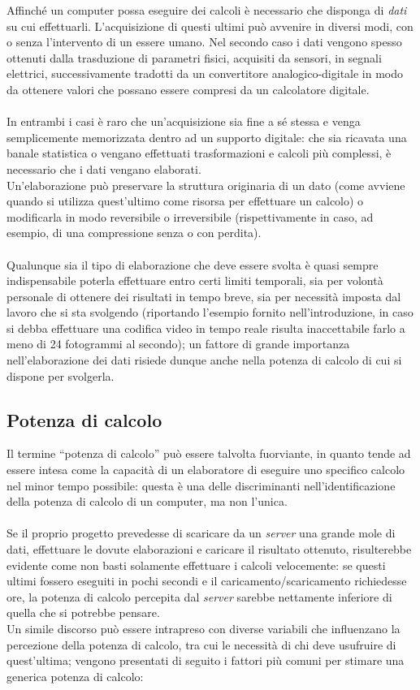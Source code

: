 Affinché un computer possa eseguire dei calcoli è necessario che disponga di
\emph{dati} su cui effettuarli. L'acquisizione di questi ultimi può avvenire
in diversi modi, con o senza l'intervento di un essere umano.
Nel secondo caso i dati vengono spesso ottenuti dalla trasduzione 
di parametri fisici, acquisiti da sensori, in segnali elettrici, successivamente
tradotti da un convertitore analogico-digitale in modo da ottenere valori che 
possano essere compresi da un calcolatore digitale.
\\ \\
In entrambi i casi è raro che un'acquisizione sia fine a sé stessa e venga
semplicemente memorizzata dentro ad un supporto digitale: che sia ricavata una
banale statistica o vengano effettuati trasformazioni e calcoli più complessi,
è necessario che i dati vengano elaborati. \\
Un'elaborazione può preservare la struttura originaria di un dato (come avviene
quando si utilizza quest'ultimo come risorsa per effettuare un calcolo) o
modificarla in modo reversibile o irreversibile (rispettivamente in caso, ad
esempio, di una compressione senza o con perdita). 
\\ \\
Qualunque sia il tipo di elaborazione che deve essere svolta è quasi sempre
indispensabile poterla effettuare entro certi limiti temporali, sia per
volontà personale di ottenere dei risultati in tempo breve, sia per
necessità imposta dal lavoro che si sta svolgendo (riportando l'esempio fornito
nell'introduzione, in caso si debba effettuare una codifica video in tempo reale
risulta inaccettabile farlo a meno di 24 fotogrammi al secondo); un fattore di
grande importanza nell'elaborazione dei dati risiede dunque anche nella potenza
di calcolo di cui si dispone per svolgerla.
\subsection{Potenza di calcolo}
Il termine ``potenza di calcolo'' può essere talvolta fuorviante, in quanto
tende ad essere intesa come la capacità di un elaboratore di eseguire uno
specifico calcolo nel minor tempo possibile: questa è una delle discriminanti
nell'identificazione della potenza di calcolo di un computer, ma non l'unica. 
\\ \\
Se il proprio progetto prevedesse di scaricare da un \emph{server} una grande
mole di dati, effettuare le dovute elaborazioni e caricare il risultato 
ottenuto, risulterebbe evidente come non basti solamente effettuare i calcoli
velocemente: se questi ultimi fossero eseguiti in pochi secondi e il
caricamento/scaricamento richiedesse ore, la potenza di calcolo percepita
dal \emph{server} sarebbe nettamente inferiore di quella che si potrebbe
pensare. \\
Un simile discorso può essere intrapreso con diverse variabili che influenzano
la percezione della potenza di calcolo, tra cui le necessità di chi deve
usufruire di quest'ultima; vengono presentati di seguito i fattori più
comuni per stimare una generica potenza di calcolo:

